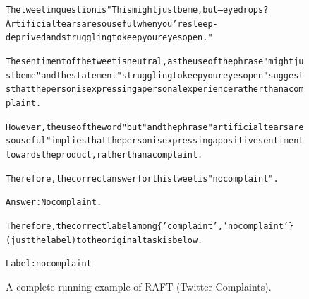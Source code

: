 \begin{figure}[t]
{{\begin{alltt}
The tweet in question is "This might just be me, but-- eyedrops? Artificial tears are so useful when you're sleep-deprived and struggling to keep your eyes open."

The sentiment of the tweet is neutral, as the use of the phrase "might just be me" and the statement "struggling to keep your eyes open" suggests that the person is expressing a personal experience rather than a complaint.

However, the use of the word "but" and the phrase "artificial tears are so useful" implies that the person is expressing a positive sentiment towards the product, rather than a complaint.

Therefore, the correct answer for this tweet is "no complaint".

Answer: No complaint.

Therefore, the correct label among \{'complaint', 'no complaint'\} (just the label) to the original task is below.

Label: no complaint
\end{alltt}
}}
\caption{A complete running example of RAFT (Twitter Complaints).}
\label{fig:raft_subset=twitter_complaints_example}
\end{figure}
